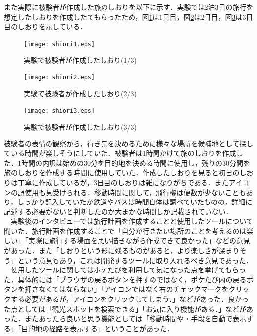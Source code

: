\documentclass{funthesis}
\begin{document}
また実際に被験者が作成した旅のしおりを以下に示す．実験では2泊3日の旅行を想定したしおりを作成したてもらったため，図\ref{Lshiori1}は1日目，図\ref{Lshiori2}は2日目，図\ref{Lshiori3}は3日目のしおりを示している．

\begin{figure}[htpb]
\begin{center}
\texttt{[image: shiori1.eps]}
\end{center}
\caption{実験で被験者が作成したしおり(1/3)}
\label{Lshiori1}
\end{figure}

\begin{figure}[htpb]
\begin{center}
\texttt{[image: shiori2.eps]}
\end{center}
\caption{実験で被験者が作成したしおり(2/3)}
\label{Lshiori2}
\end{figure}

\begin{figure}[htpb]
\begin{center}
\texttt{[image: shiori3.eps]}
\end{center}
\caption{実験で被験者が作成したしおり(3/3)}
\label{Lshiori3}
\end{figure}


被験者の表情の観察から，行き先を決めるために様々な場所を候補地として探している時間が楽しそうにしていた．被験者は1時間かけて旅のしおりを作成した．1時間の内訳は始めの30分を目的地を決める時間に使用し，残りの30分間を旅のしおりを作成する時間に使用していた．作成したしおりを見ると初日のしおりは丁寧に作成しているが，3日目のしおりは雑になりがちである．またアイコンの誤使用も見受けられる．移動時間に関して，飛行機は便数が少ないこともあり，しっかり記入していたが鉄道やバスは時間自体は調べていたものの，詳細に記述する必要がないと判断したのか大まかな時間しか記載されていない．\\
　実験後のインタビューでは旅行計画を作成することと使用したツールについて聞いた．旅行計画を作成することで「自分が行きたい場所のことを考えるのは楽しい」「実際に旅行する場面を思い描きながら作成できて良かった」などの意見があった．また「しおりという形に残るものがあると，より楽しさが深まりそう」という意見もあり，これは開発するツールに取り入れるべき意見であった．\\
　使用したツールに関してはポケたびを利用して気になった点を挙げてもらった．具体的には「ブラウザの戻るボタンを押すのではなく，ポケたび内の戻るボタンを押さなくてはならない」「アイコンではなく右のチェックマークをクリックする必要があるが，アイコンをクリックしてしまう．」などがあった．良かった点としては「観光スポットを検索できる」「お気に入り機能がある．」などがあった．またあったら良いと思う機能としては「移動時間や・手段を自動で表示する」「目的地の経路を表示する」ということがあった．
\end{document}
